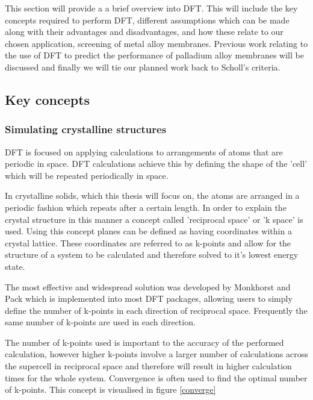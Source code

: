 This section will provide a a brief overview into DFT. This will include the key concepts required to perform DFT, different assumptions which can be made along with their advantages and disadvantages, and how these relate to our chosen application, screening of metal alloy membranes. Previous work relating to the use of DFT to predict the performance of palladium alloy membranes will be discussed and finally we will tie our planned work back to Scholl's criteria.

\subsection{Key concepts}
\subsubsection{Simulating crystalline structures}
DFT is focused on applying calculations to arrangements of atoms that are periodic in space. DFT calculations achieve this by defining the shape of the 'cell' which will be repeated periodically in space. \cite{doi:10.1002/9780470447710.ch2}

In crystalline solids, which this thesis will focus on, the atoms are arranged in a periodic fashion which repeats after a certain length. In order to explain the crystal structure in this manner a concept called 'reciprocal space' or 'k space' is used. Using this concept planes can be defined as having coordinates within a crystal lattice. These coordinates are referred to as k-points and allow for the structure of a system to be calculated and therefore solved to it's lowest energy state. \cite{doi:10.1002/9780470447710.ch2}

The most effective and widespread solution was developed by Monkhorst and Pack which is implemented into most DFT packages, allowing users to simply define the number of k-points in each direction of reciprocal space. Frequently the same number of k-points are used in each direction. \cite{doi:10.1002/9780470447710.ch4}

The number of k-points used is important to the accuracy of the performed calculation, however higher k-points involve a larger number of calculations across the supercell in reciprocal space and therefore will result in higher calculation times for the whole system. \cite{doi:10.1002/9780470447710.ch4} Convergence is often used to find the optimal number of k-points. This concept is visualised in figure \ref{converge}

